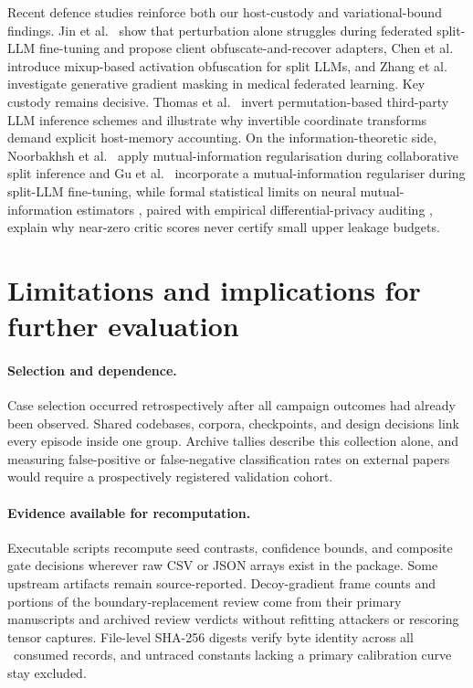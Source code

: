 Recent defence studies reinforce both our host-custody and
variational-bound findings. Jin et al.\ \cite{privpair2026} show that
perturbation alone struggles during federated split-LLM fine-tuning and
propose client obfuscate-and-recover adapters, Chen et al.\
\cite{mixguard2026} introduce mixup-based activation obfuscation for split
LLMs, and Zhang et al.\ \cite{aegis2026} investigate generative gradient
masking in medical federated learning. Key custody remains decisive. Thomas
et al.\ \cite{permattack2025} invert permutation-based third-party LLM
inference schemes and illustrate why invertible coordinate transforms
demand explicit host-memory accounting. On the information-theoretic side,
Noorbakhsh et al.\ \cite{mitech2026} apply mutual-information
regularisation during collaborative split inference and Gu et al.\
\cite{pidi2026} incorporate a mutual-information regulariser during
split-LLM fine-tuning, while formal statistical limits on neural
mutual-information estimators \cite{belghazi2018,mcallester2020,song2020},
paired with empirical differential-privacy auditing \cite{jagielski2020},
explain why near-zero critic scores never certify small upper leakage
budgets.

\section{Limitations and implications for further evaluation}
\label{sec:limits}

\paragraph{Selection and dependence.}
Case selection occurred retrospectively after all campaign outcomes had
already been observed. Shared codebases, corpora, checkpoints, and design
decisions link every episode inside one group. Archive tallies describe
this collection alone, and measuring false-positive or false-negative
classification rates on external papers would require a prospectively
registered validation cohort.

\paragraph{Evidence available for recomputation.}
Executable scripts recompute seed contrasts, confidence bounds, and
composite gate decisions wherever raw CSV or JSON arrays exist in the
package. Some upstream artifacts remain source-reported. Decoy-gradient
frame counts and portions of the boundary-replacement review come from
their primary manuscripts and archived review verdicts without refitting
attackers or rescoring tensor captures. File-level SHA-256 digests verify
byte identity across all \PinnedInputs\ consumed records, and untraced
constants lacking a primary calibration curve stay excluded.

